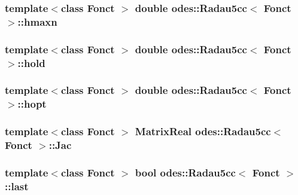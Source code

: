 \hypertarget{classodes_1_1Radau5cc_aa3b6b73884b0a085cf7f2b701940658e}{
\subsubsection[{hmaxn}]{\setlength{\rightskip}{0pt plus 5cm}template$<$class Fonct $>$ double {\bf odes\-::\-Radau5cc}$<$ Fonct $>$\-::hmaxn\hspace{0.3cm}{\ttfamily [private]}}}\label{classodes_1_1Radau5cc_aa3b6b73884b0a085cf7f2b701940658e}
\hypertarget{classodes_1_1Radau5cc_a042b65cfeb0816edd1c2218ea9fe56c9}{
\subsubsection[{hold}]{\setlength{\rightskip}{0pt plus 5cm}template$<$class Fonct $>$ double {\bf odes\-::\-Radau5cc}$<$ Fonct $>$\-::hold\hspace{0.3cm}{\ttfamily [private]}}}\label{classodes_1_1Radau5cc_a042b65cfeb0816edd1c2218ea9fe56c9}
\hypertarget{classodes_1_1Radau5cc_a9c91cdeb773885e6b7cf3699142c80eb}{
\subsubsection[{hopt}]{\setlength{\rightskip}{0pt plus 5cm}template$<$class Fonct $>$ double {\bf odes\-::\-Radau5cc}$<$ Fonct $>$\-::hopt\hspace{0.3cm}{\ttfamily [private]}}}\label{classodes_1_1Radau5cc_a9c91cdeb773885e6b7cf3699142c80eb}
\hypertarget{classodes_1_1Radau5cc_a67b952c35d2c7ecddc9dd75cb2c3afe1}{
\subsubsection[{Jac}]{\setlength{\rightskip}{0pt plus 5cm}template$<$class Fonct $>$ {\bf Matrix\-Real} {\bf odes\-::\-Radau5cc}$<$ Fonct $>$\-::Jac\hspace{0.3cm}{\ttfamily [private]}}}\label{classodes_1_1Radau5cc_a67b952c35d2c7ecddc9dd75cb2c3afe1}
\hypertarget{classodes_1_1Radau5cc_a3eed33adfb541114d62bafd3144bf188}{
\subsubsection[{last}]{\setlength{\rightskip}{0pt plus 5cm}template$<$class Fonct $>$ bool {\bf odes\-::\-Radau5cc}$<$ Fonct $>$\-::last\hspace{0.3cm}{\ttfamily [private]}}}\label{classodes_1_1Radau5cc_a3eed33adfb541114d62bafd3144bf188}
